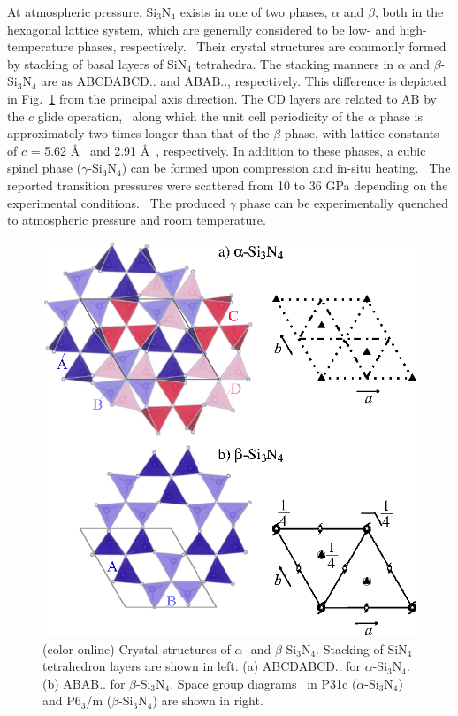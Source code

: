 \documentclass[twocolumn,amsmath,amssymb,a4paper,prb,superscriptaddress,floatfix]{revtex4-1}
\begin{document}
At atmospheric pressure, Si$_3$N$_4$ exists in one of two phases, $\alpha$ and
$\beta$, both in the hexagonal lattice system, which are generally considered
to be low- and high-temperature phases,
respectively.~\cite{zhou,hirosaki,riley} Their crystal structures are commonly
formed by stacking of basal layers of SiN$_4$ tetrahedra.  The stacking manners
in $\alpha$ and $\beta$-Si$_3$N$_4$ are as ABCDABCD.. and ABAB.., respectively.
This difference is depicted in Fig.~\ref{fig:Fig1_cryst} from the principal
axis direction.  
The CD layers are related to AB by the $c$ glide operation,~\cite{hampshire} along which the unit cell periodicity of the $\alpha$ phase
is approximately two times longer than that of the $\beta$ phase, with lattice
constants of $c$ = 5.62 \AA~\cite{yashima} and 2.91 \AA~\cite{boulay}, respectively.
In addition to these phases, a cubic spinel phase ($\gamma$-Si$_3$N$_4$) can be
formed upon compression and in-situ heating.~\cite{zerr,zhang} The reported
transition pressures were scattered from 10 to 36 GPa depending on the
experimental conditions.~\cite{xu}  The produced $\gamma$ phase can be experimentally
quenched to atmospheric pressure and room temperature.
\begin{figure}[ht]
 \begin{center}
  \includegraphics[width=0.90\linewidth]{Fig1_crystal_str2.eps} \caption{(color
  online) Crystal structures of $\alpha$- and $\beta$-Si$_3$N$_4$. Stacking of
  SiN$_4$ tetrahedron layers are shown in left. (a) ABCDABCD.. for
  $\alpha$-Si$_3$N$_4$. (b) ABAB.. for $\beta$-Si$_3$N$_4$.  Space group
  diagrams~\cite{inttableA} in P31c ($\alpha$-Si$_3$N$_4$) and P6$_3$/m ($\beta$-Si$_3$N$_4$)
  are shown in right.}
  \label{fig:Fig1_cryst} 
 \end{center}
\end{figure}
\end{document}
